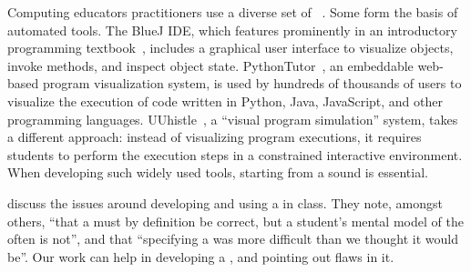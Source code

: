 Computing educators practitioners use a diverse set of \nms{}~\cite{fincherNotionalMachinesComputing2020}.
Some \nms{} form the basis of automated tools.
The BlueJ IDE,
which features prominently in an introductory programming textbook~\cite{kollingObjectsFirstJava2017},
includes a graphical user interface to visualize objects, invoke methods, and inspect object state.
PythonTutor~\cite{guoOnlinePythonTutor2013}, an embeddable web-based program visualization system,
is used by hundreds of thousands of users to visualize the execution of code written in Python, Java, JavaScript, and other programming languages.
UUhistle~\cite{sorvaUUhistleSoftwareTool2010}, a ``visual program simulation'' system, takes a different approach:
instead of visualizing program executions, it requires students to perform the execution steps in a constrained interactive environment.
When developing such widely used tools, starting from a sound \nm{} is essential.


\citet{dicksonExperiencesImplementingUtilizing2022} discuss the issues around developing and using a \nm{} in class. They note, amongst others, ``that a \nm{} must by definition be correct, but a student's mental model of the \nm{} often is not'', and that ``specifying a \nm{} was more difficult than we thought it would be''. Our work can help in developing a \nm{}, and pointing out flaws in it. 



